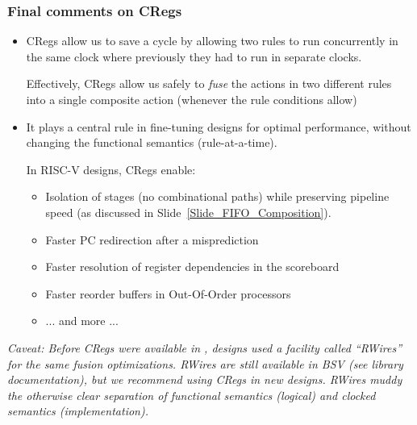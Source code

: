 \begin{frame}[fragile]
\frametitle{Final comments on CRegs}

\footnotesize

\begin{itemize}

 \item CRegs allow us to save a cycle by allowing two rules to run
       concurrently in the same clock where previously they had to run
       in separate clocks.

       \vspace{1ex}

       Effectively, CRegs allow us safely to \emph{fuse} the actions
       in two different rules into a single composite action (whenever
       the rule conditions allow)

 \item It plays a central rule in fine-tuning {\BSV} designs for
       optimal performance, without changing the functional semantics
       (rule-at-a-time).

       \vspace{1ex}

       In RISC-V designs, CRegs enable:
       \begin{itemize}\footnotesize

         \item Isolation of stages (no combinational paths) while
               preserving pipeline speed (as discussed in
               Slide~\ref{Slide_FIFO_Composition}).

         \item Faster PC redirection after a misprediction
         \item Faster resolution of register dependencies in the scoreboard
         \item Faster reorder buffers in Out-Of-Order processors
         \item ... and more ...
       \end{itemize}

\end{itemize}

\PAUSE{\vspace*{5ex}}

 \emph{Caveat: Before CRegs were available in {\BSV}, designs used a
       facility called ``RWires'' for the same fusion optimizations.
       RWires are still available in BSV (see library documentation),
       but we recommend using CRegs in new designs.  RWires muddy the
       otherwise clear separation of functional semantics (logical)
       and clocked semantics (implementation).}

\end{frame}







